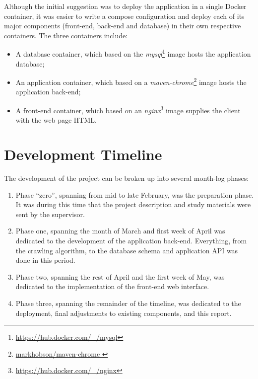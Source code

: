 Although the initial suggestion was to deploy the application in a single Docker container, it was easier to write a compose configuration and deploy each of its major components (front-end, back-end and database) in their own respective containers. The three containers include:
\begin{itemize}
    \item A database container, which based on the \textit{mysql}\footnote{\url{https://hub.docker.com/_/mysql}} image hosts the application database;
    \item An application container, which based on a \textit{maven-chrome}\footnote{\url{markhobson/maven-chrome
    }} image hosts the application back-end;
    \item A front-end container, which based on an \textit{nginx}\footnote{\url{https://hub.docker.com/_/nginx}} image supplies the client with the web page HTML\@.
\end{itemize}

\newpage
\section{Development Timeline}

The development of the project can be broken up into several month-log phases:
\begin{enumerate}
    \item Phase ``zero'', spanning from mid to late February, was the preparation phase. It was during this time that the project description and study materials were sent by the supervisor.
    \item Phase one, spanning the month of March and first week of April was dedicated to the development of the application back-end. Everything, from the crawling algorithm, to the database schema and application API was done in this period.
    \item Phase two, spanning the rest of April and the first week of May, was dedicated to the implementation of the front-end web interface.
    \item Phase three, spanning the remainder of the timeline, was dedicated to the deployment, final adjustments to existing components, and this report.
\end{enumerate}
